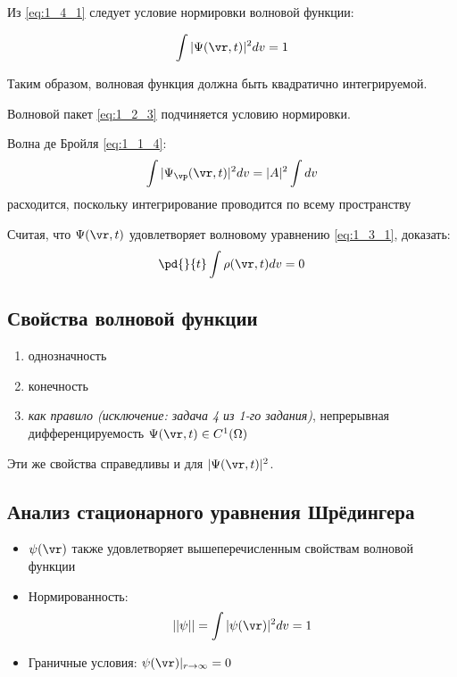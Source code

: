 Из \eqref{eq:1_4_1} следует условие нормировки волновой функции:

\begin{equation}
\label{eq:1_4_3}
\int |\Psi(\vr,t)|^2 dv = 1
\end{equation}

Таким образом, волновая функция должна быть квадратично интегрируемой.

\begin{exmpl}
Волновой пакет \eqref{eq:1_2_3} подчиняется условию нормировки.
\end{exmpl}

\begin{exmpl}
Волна де Бройля \eqref{eq:1_1_4}:
$$\int |\Psi_{\vp}(\vr,t)|^2 dv = |A|^2 \int dv$$
расходится, поскольку интегрирование проводится по всему пространству
\end{exmpl}


\begin{excr}
Считая, что $\Psi(\vr,t)$ удовлетворяет волновому уравнению \eqref{eq:1_3_1}, доказать:
$$\pd{}{t} \int \rho(\vr,t) dv = 0$$
\end{excr}

\subsection*{Свойства волновой функции}

\begin{enumerate}
\item однозначность
\item конечность
\item \textit{как правило (исключение: задача 4 из 1-го задания)}, непрерывная дифференцируемость $\Psi(\vr,t) \in C^1(\Omega)$
\end{enumerate}

Эти же свойства справедливы и для $|\Psi(\vr,t)|^2$.

\subsection*{Анализ стационарного уравнения Шрёдингера}

\begin{itemize}
\item $\psi(\vr)$ также удовлетворяет вышеперечисленным свойствам волновой функции
\item Нормированность: 
\begin{equation}
\label{eq:1_4_4}
||\psi|| = \int |\psi(\vr)|^2 dv = 1
\end{equation}
\item Граничные условия: $\psi(\vr)|_{r \to \infty} = 0$
\end{itemize}

